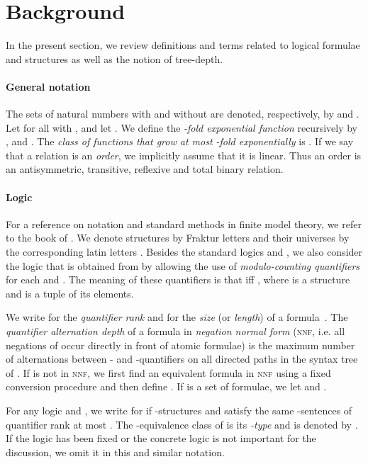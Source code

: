 \documentclass[11pt]{article}
\begin{document}
\section{Background}
\label{sec:background}

In the present section, we review definitions and terms related to logical
formulae and structures as well as the notion of tree-depth.

\paragraph{General notation}

The sets of natural numbers with and without  are denoted, respectively, by
 and .  Let  for all  with
, and let . We define the \emph{-fold exponential
function}  recursively by , and .  The \emph{class of functions that grow at most -fold
exponentially} is . If we say that a
relation is an \emph{order}, we implicitly assume that it is linear. Thus an
order is an antisymmetric, transitive, reflexive and total binary relation.

\paragraph{Logic}

For a reference on notation and standard methods in finite model theory, we
refer to the book of \cite{Libkin2004}.  We denote structures by Fraktur
letters  and their universes by the
corresponding latin letters .  Besides the standard logics
 and , we also consider the logic  that is obtained
from  by allowing the use of \emph{modulo-counting quantifiers}
 for each  and .  The meaning of
these quantifiers is that  iff , where  is a structure and  is a tuple of its elements.

We write  for the \emph{quantifier rank} and  for the
\emph{size} (or \emph{length}) of a formula~.  The \emph{quantifier
alternation depth}  of a formula  in \emph{negation normal
form} (\textsc{nnf}, i.e. all negations of  occur directly in front of
atomic formulae) is the maximum number of alternations between - and
-quanti\-fiers on all directed paths in the syntax tree of . If
 is not in \textsc{nnf}, we first find an equivalent formula  in
\textsc{nnf} using a fixed conversion procedure and then define .  If  is a set of formulae, we let  and .

For any logic  and , we write
 for  if -structures  and 
satisfy the same -sentences of quantifier rank at most . The
-equivalence class of  is its \emph{-type} and is
denoted by .  If the logic  has been fixed or the
concrete logic is not important for the discussion, we omit it in this and
similar notation.
\end{document}
